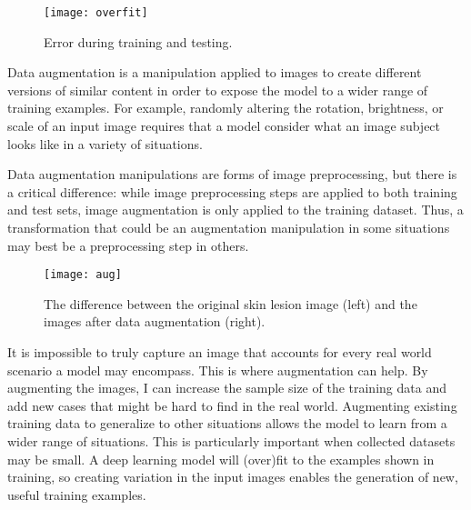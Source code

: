\begin{figure}[!h]
\centering
	\texttt{[image: overfit]}
		\caption{Error during training and testing.}
		\label{Fig:fit} 
\end{figure}


Data augmentation is a manipulation applied to images to create different versions of similar content in order to expose the model to a wider range of training examples. For example, randomly altering the rotation, brightness, or scale of an input image requires that a model consider what an image subject looks like in a variety of situations.

Data augmentation manipulations are forms of image preprocessing, but there is a critical difference: while image preprocessing steps are applied to both training and test sets, image augmentation is only applied to the training dataset. Thus, a transformation that could be an augmentation manipulation in some situations may best be a preprocessing step in others.

\begin{figure}[!h]
\centering
	\texttt{[image: aug]}
		\caption{The difference between the original skin lesion image (left) and the images after data augmentation (right).}
		\label{Fig:aug} 
\end{figure}

It is impossible to truly capture an image that accounts for every real world scenario a model may encompass. This is where augmentation can help. By augmenting the images, I can increase the sample size of the training data and add new cases that might be hard to find in the real world. Augmenting existing training data to generalize to other situations allows the model to learn from a wider range of situations. This is particularly important when collected datasets may be small. A deep learning model will (over)fit to the examples shown in training, so creating variation in the input images enables the generation of new, useful training examples.


